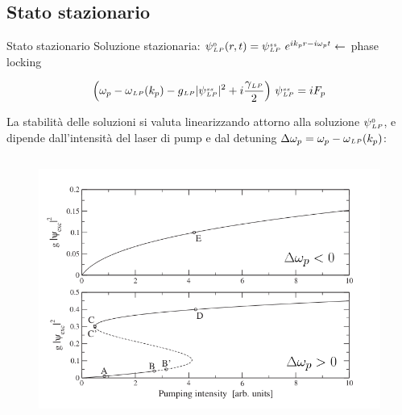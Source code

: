 \documentclass[10pt]{beamer}
\begin{document}
\subsection{Stato stazionario}

\begin{frame}{Stato stazionario}
%
Soluzione stazionaria: \( \psi{\scriptstyle^{0}_{ LP}}(r,t) = \psi{\scriptstyle ^{ss}_{LP}} \ e^{ik_pr - i\omega_p t}  \leftarrow\) \alert{phase locking}

\[
 \left( \omega_p - \omega{\scriptstyle _{LP}} (k_p) - g{\scriptstyle _{LP}} |\psi{\scriptstyle ^{ss}_{LP}}|^2 + i \frac{\gamma{\scriptstyle _{LP}}}{2} \right)\, \psi{\scriptstyle ^{ss}_{LP}} = i F_p
\]



\begin{figure}
 \end{figure}

La stabilità delle soluzioni si valuta linearizzando attorno alla soluzione $\psi{\scriptstyle^{0}_{ LP}}$, e dipende dall'intensità del laser di pump e dal detuning \(\Delta \omega_p = \omega_p - \omega{\scriptstyle _{LP}}(k_p)\):
\begin{columns}[t]
 \begin{column}{.5\textwidth}
  \begin{figure}
   \includegraphics[width=\columnwidth]{pics/Shapevspump.png}
  \end{figure}

 \end{column}


\end{columns}
\end{frame}
\end{document}
